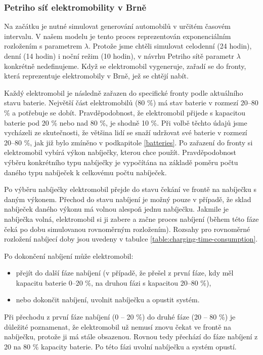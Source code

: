 \documentclass[a4paper,11pt]{article}
\begin{document}
\subsubsection{Petriho síť elektromobility v Brně}

Na začátku je nutné simulovat generování automobilů v určitém časovém intervalu. V našem modelu je tento proces reprezentován exponenciálním rozložením s parametrem \(\lambda\). Protože jsme chtěli simulovat celodenní (24 hodin), denní (14 hodin) i noční režim (10 hodin), v návrhu Petriho sítě parametr \(\lambda\) konkrétně nedefinujeme. Když se elektromobil vygeneruje, zařadí se do fronty, která reprezentuje elektromobily v Brně, jež se chtějí nabít. 

Každý elektromobil je následně zařazen do specifické fronty podle aktuálního stavu baterie. Největší část elektromobilů (80 \%) má stav baterie v rozmezí 20–80 \% a potřebuje se dobít. Pravděpodobnost, že elektromobil přijede s kapacitou baterie pod 20 \% nebo nad 80 \%, je shodně 10 \%. Při volbě těchto údajů jsme vycházeli ze skutečnosti, že většina lidí se snaží udržovat své baterie v rozmezí 20–80 \%, jak již bylo zmíněno v podkapitole \ref{batteries}. Po zařazení do fronty si elektromobil vybírá výkon nabíječky, kterou chce použít. Pravděpodobnost výběru konkrétního typu nabíječky je vypočítána na základě poměru počtu daného typu nabíječek k celkovému počtu nabíječek.

Po výběru nabíječky elektromobil přejde do stavu čekání ve frontě na nabíječku s daným výkonem. Přechod do stavu nabíjení je možný pouze v případě, že sklad nabíječek daného výkonu má volnou alespoň jednu nabíječku. Jakmile je nabíječka volná, elektromobil si ji zabere a začne proces nabíjení (během této fáze čeká po dobu simulovanou rovnoměrným rozložením). Rozsahy pro rovnoměrné rozložení nabíjecí doby jsou uvedeny v tabulce \ref{table:charging-time-consumption}.


Po dokončení nabíjení může elektromobil:
\begin{itemize}
    \item přejít do další fáze nabíjení (v případě, že přešel z první fáze, kdy měl kapacitu baterie 0–20 \%, na druhou fázi s kapacitou 20–80 \%),
    \item nebo dokončit nabíjení, uvolnit nabíječku a opustit systém.
\end{itemize}

Při přechodu z první fáze nabíjení (0 -- 20 \%) do druhé fáze (20 -- 80 \%) je důležité poznamenat, že elektromobil už nemusí znovu čekat ve frontě na nabíječku, protože ji má stále obsazenou. Rovnou tedy přechází do fáze nabíjení z 20 na 80 \% kapacity baterie. Po této fázi uvolní nabíječku a systém opustí.
\end{document}
